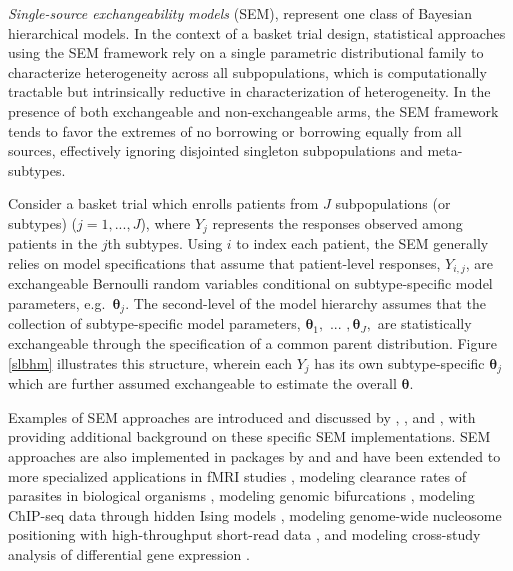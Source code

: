\textit{Single-source exchangeability models} (SEM), represent one class of Bayesian hierarchical models. In the context of a basket trial design, statistical approaches using the SEM framework rely on a single parametric distributional family to characterize heterogeneity across all subpopulations, which is computationally tractable but intrinsically reductive in characterization of heterogeneity. In the presence of both exchangeable and non-exchangeable arms, the SEM framework tends to favor the extremes of no borrowing or borrowing equally from all sources, effectively ignoring disjointed singleton subpopulations and meta-subtypes. %

Consider a basket trial which enrolls patients from $J$ subpopulations (or subtypes) ($j=1,...,J$), where $Y_j$ represents the responses observed among patients in the $j$th subtypes. Using $i$ to index each patient, the SEM generally relies on model specifications that assume that patient-level responses, $Y_{i,j}$, are exchangeable Bernoulli random variables conditional on subtype-specific model parameters, e.g.\ ${\bm\theta_j}$. The second-level of the model hierarchy assumes that the collection of subtype-specific model parameters, ${\bm\theta_1},$ $...$ $,{\bm\theta_J},$ are statistically exchangeable through the specification of a common parent distribution. Figure \ref{slbhm} illustrates this structure, wherein each $Y_j$ has its own subtype-specific ${\bm\theta_j}$ which are further assumed exchangeable to estimate the overall ${\bm\theta}$. 

Examples of SEM approaches are introduced and discussed by \cite[][chapter 2]{berry:2010}, \cite{thall2003sim}, and \cite{berry2013ct}, with \cite{hobbs2018monitor} providing additional background on these specific SEM implementations. SEM approaches are also implemented in packages by \cite{bclust} and \cite{BHC} and have been extended to more specialized applications in fMRI studies \citep{stocco2014}, modeling clearance rates of parasites in biological organisms \citep{bhrcr}, modeling genomic bifurcations \citep{mfa}, modeling ChIP-seq data through hidden Ising models \citep{iSeq}, modeling genome-wide nucleosome positioning with high-throughput short-read data \citep{RJMCMCNucleosomes}, and modeling cross-study analysis of differential gene expression \citep{XDE}.

